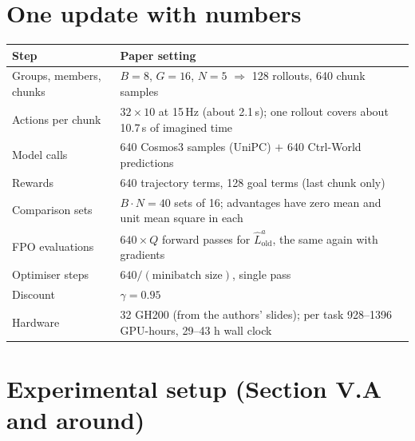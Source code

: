 \documentclass[11pt,a4paper]{article}
\newcommand{\Lh}{\hat L^{a}}
\theoremstyle{remark}
\begin{document}
\section{One update with numbers}
\begin{center}
\small
\begin{tabularx}{\linewidth}{@{}l Y@{}}
\toprule
Step & Paper setting\\
\midrule
Groups, members, chunks & $B=8$, $G=16$, $N=5$ $\Rightarrow$ 128 rollouts, 640 chunk samples\\
Actions per chunk & $32\times10$ at 15\,Hz (about 2.1\,s); one rollout covers about 10.7\,s of imagined time\\
Model calls & 640 Cosmos3 samples (UniPC) $+$ 640 Ctrl-World predictions\\
Rewards & 640 trajectory terms, 128 goal terms (last chunk only)\\
Comparison sets & $B\cdot N=40$ sets of 16; advantages have zero mean and unit mean square in each\\
FPO evaluations & $640\times Q$ forward passes for $\Lh_{\mathrm{old}}$, the same again with gradients\\
Optimiser steps & $640/(\text{minibatch size})$, single pass\\
Discount & $\gamma=0.95$\\
Hardware & 32 GH200 (from the authors' slides); per task 928--1396 GPU-hours, 29--43 h wall clock\\
\bottomrule
\end{tabularx}
\end{center}

\section{Experimental setup (Section V.A and around)}
\end{document}
